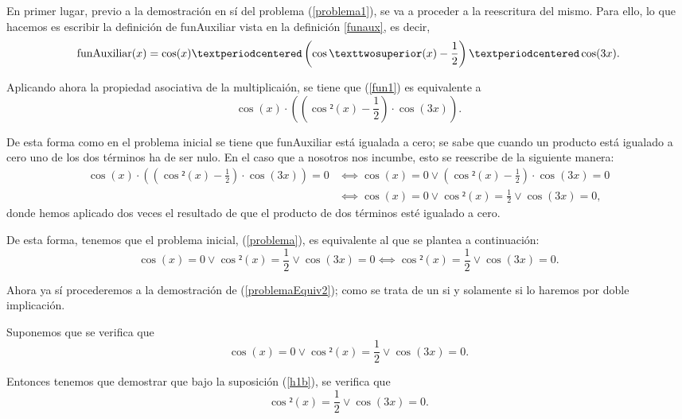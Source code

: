 \begin{demostracion}
  En primer lugar, previo a la demostración en sí del problema
  (\ref{problema1}), se va a proceder a la reescritura del mismo.
  Para ello, lo que hacemos es escribir la definición de
  funAuxiliar vista en la definición \ref{funaux}, es decir,
  \begin{equation}\label{fun1}
    \funauxiliar(x) = \cos(x)·\left(\cos²(x)-\frac{1}{2}\right)·\cos(3x).
  \end{equation}

  Aplicando ahora la propiedad asociativa de la multiplicaión,
  se tiene que (\ref{fun1}) es equivalente a
  \begin{equation}\label{fun2}
    \cos(x)·\left(\left(\cos²(x)-\frac{1}{2}\right)·\cos(3x)\right).
  \end{equation}

  De esta forma como en el problema inicial se tiene que funAuxiliar
  está igualada a cero; se sabe que cuando un producto está igualado
  a cero uno de los dos términos ha de ser nulo. En el caso que a
  nosotros nos incumbe, esto se reescribe de la siguiente manera:
  \begin{align}
    \cos(x)·\left(\left(\cos²(x)-\frac{1}{2}\right)·\cos(3x)\right)=0
    &⟺ \cos(x) = 0 ∨ \left(\cos²(x)-\frac{1}{2}\right)·\cos(3x)=0 \\
    &⟺ \cos(x) = 0 ∨ \cos²(x)=\frac{1}{2} ∨ \cos(3x)=0,
  \end{align}
  donde hemos aplicado dos veces el resultado de que el producto
  de dos términos esté igualado a cero.

  De esta forma, tenemos que el problema inicial, (\ref{problema}),
  es equivalente al que se plantea a continuación:
  \begin{equation}\label{problemaEquiv2}
    \cos(x)=0 \lor \cos²(x)=\frac{1}{2} \lor \cos(3x)=0
    ⟺ \cos²(x)=\frac{1}{2} \lor \cos(3x)=0.
  \end{equation}

  Ahora ya sí procederemos a la demostración de
  (\ref{problemaEquiv2}); como se trata de un si y solamente si
  lo haremos por doble implicación.

  \noindent
  \framebox{\longrightarrow} Suponemos que se verifica que
  \begin{equation}\label{Casosh1}\tag{h1}
    \cos(x)=0 \lor \cos²(x)=\frac{1}{2} \lor \cos(3x)=0.
  \end{equation}

  Entonces tenemos que demostrar que bajo la suposición (\ref{h1b}),
  se verifica que
  \begin{equation}\label{CasosConc1}
     \cos²(x)=\frac{1}{2} \lor \cos(3x)=0.
  \end{equation}


\end{demostracion}
